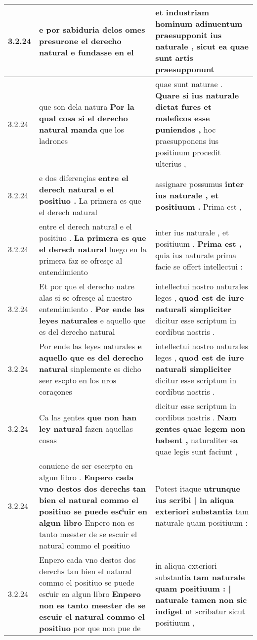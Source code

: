 \begin{tabular}{|p{1cm}|p{6.5cm}|p{6.5cm}|}
3.2.24 & e por sabiduria delos omes \textbf{ presurone el derecho natural } e fundasse en el & et industriam hominum adinuentum \textbf{ praesupponit ius naturale , } sicut ea quae sunt artis praesupponunt \\\hline
3.2.24 & que son dela natura \textbf{ Por la qual cosa si el derecho natural manda } que los ladrones & quae sunt naturae . \textbf{ Quare si ius naturale dictat fures et maleficos esse puniendos , } hoc praesupponens ius positiuum procedit ulterius , \\\hline
3.2.24 & e dos diferençias \textbf{ entre el derech natural e el positiuo . } La primera es que el derech natural & assignare possumus \textbf{ inter ius naturale , et positiuum . } Prima est , \\\hline
3.2.24 & entre el derech natural e el positiuo . \textbf{ La primera es que el derech natural } luego en la primera faz se ofresçe al entendimiento & inter ius naturale , et positiuum . \textbf{ Prima est , } quia ius naturale prima facie se offert intellectui : \\\hline
3.2.24 & Et por que el derecho natre alas si se ofresçe al nuestro entendimiento . \textbf{ Por ende las leyes naturales } e aquello que es del derecho natural & intellectui nostro naturales leges , \textbf{ quod est de iure naturali simpliciter } dicitur esse scriptum in cordibus nostris . \\\hline
3.2.24 & Por ende las leyes naturales \textbf{ e aquello que es del derecho natural } sinplemente es dicho seer escpto en los nros coraçones & intellectui nostro naturales leges , \textbf{ quod est de iure naturali simpliciter } dicitur esse scriptum in cordibus nostris . \\\hline
3.2.24 & Ca las gentes \textbf{ que non han ley natural } fazen aquellas cosas & dicitur esse scriptum in cordibus nostris . \textbf{ Nam gentes quae legem non habent , } naturaliter ea quae legis sunt faciunt , \\\hline
3.2.24 & conuiene de ser escerpto en algun libro . \textbf{ Enpero cada vno destos dos derechs tan bien el natural commo el positiuo se puede escͥuir en algun libro } Enpero non es tanto meester de se escuir el natural commo el positiuo & Potest itaque \textbf{ utrunque ius scribi | in aliqua exteriori substantia } tam naturale quam positiuum : \\\hline
3.2.24 & Enpero cada vno destos dos derechs tan bien el natural commo el positiuo se puede escͥuir en algun libro \textbf{ Enpero non es tanto meester de se escuir el natural commo el positiuo } por que non pue de & in aliqua exteriori substantia \textbf{ tam naturale quam positiuum : | naturale tamen non sic indiget } ut scribatur sicut positiuum , \\\hline

\end{tabular}
